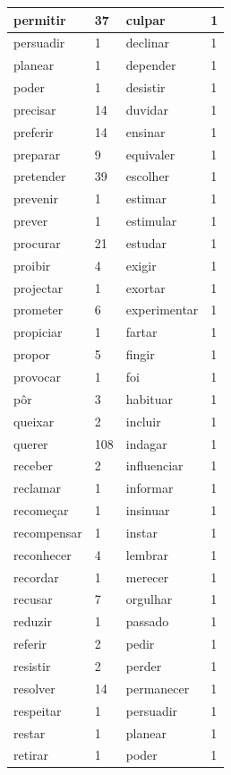 \documentclass[output=paper,colorlinks,citecolor=brown]{langscibook}
\begin{document}
\begin{longtable}{ p{3cm} | p{1cm} | p{3cm} | p{1cm} }
		permitir & 37 & culpar & 1\\\hline
		persuadir & 1 & declinar & 1\\\hline
		planear & 1 & depender & 1\\\hline
		poder & 1 & desistir & 1\\\hline
		precisar & 14 & duvidar & 1\\\hline
		preferir & 14 & ensinar & 1\\\hline
		preparar & 9 & equivaler & 1\\\hline
		pretender & 39 & escolher & 1\\\hline
		prevenir & 1 & estimar & 1\\\hline
		prever & 1 & estimular & 1\\\hline
		procurar & 21 & estudar & 1\\\hline
		proibir & 4 & exigir & 1\\\hline
		projectar & 1 & exortar & 1\\\hline
		prometer & 6 & experimentar & 1\\\hline
		propiciar & 1 & fartar & 1\\\hline
		propor & 5 & fingir & 1\\\hline
		provocar & 1 & foi & 1\\\hline
		pôr & 3 & habituar & 1\\\hline
		queixar & 2 & incluir & 1\\\hline
		querer & 108 & indagar & 1\\\hline
		receber & 2 & influenciar & 1\\\hline
		reclamar & 1 & informar & 1\\\hline
		recomeçar & 1 & insinuar & 1\\\hline
		recompensar & 1 & instar & 1\\\hline
		reconhecer & 4 & lembrar & 1\\\hline
		recordar & 1 & merecer & 1\\\hline
		recusar & 7 & orgulhar & 1\\\hline
		reduzir & 1 & passado & 1\\\hline
		referir & 2 & pedir & 1\\\hline
		resistir & 2 & perder & 1\\\hline
		resolver & 14 & permanecer & 1\\\hline
		respeitar & 1 & persuadir & 1\\\hline
		restar & 1 & planear & 1\\\hline
		retirar & 1 & poder & 1\\\hline

\end{longtable}
\end{document}
